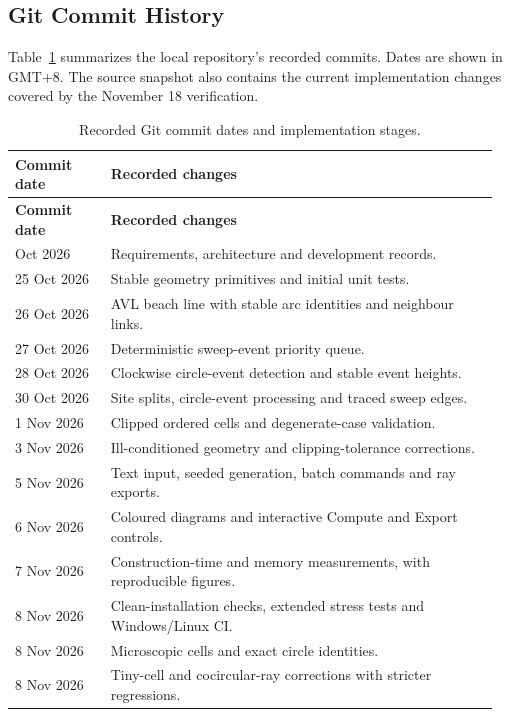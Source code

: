 \subsection{Git Commit History}

Table~\ref{tab:git-history} summarizes the local repository's recorded commits. Dates are shown in GMT+8. The source snapshot also contains the current implementation changes covered by the November 18 verification.

\begingroup
{}
\renewcommand{\arraystretch}{1.08}
\begin{longtable}{@{}p{0.19\linewidth}p{0.77\linewidth}@{}}
\caption{Recorded Git commit dates and implementation stages.}\label{tab:git-history}\\
\toprule
\textbf{Commit date} & \textbf{Recorded changes} \\
\midrule
\endfirsthead
\toprule
\textbf{Commit date} & \textbf{Recorded changes} \\
\midrule
\endhead
\bottomrule
\endfoot
24 Oct 2026 & Requirements, architecture and development records. \\
25 Oct 2026 & Stable geometry primitives and initial unit tests. \\
26 Oct 2026 & AVL beach line with stable arc identities and neighbour links. \\
27 Oct 2026 & Deterministic sweep-event priority queue. \\
28 Oct 2026 & Clockwise circle-event detection and stable event heights. \\
30 Oct 2026 & Site splits, circle-event processing and traced sweep edges. \\
1 Nov 2026 & Clipped ordered cells and degenerate-case validation. \\
3 Nov 2026 & Ill-conditioned geometry and clipping-tolerance corrections. \\
5 Nov 2026 & Text input, seeded generation, batch commands and ray exports. \\
6 Nov 2026 & Coloured diagrams and interactive Compute and Export controls. \\
7 Nov 2026 & Construction-time and memory measurements, with reproducible figures. \\
8 Nov 2026 & Clean-installation checks, extended stress tests and Windows/Linux CI. \\
8 Nov 2026 & Microscopic cells and exact circle identities. \\
8 Nov 2026 & Tiny-cell and cocircular-ray corrections with stricter regressions. \\

\end{longtable}
